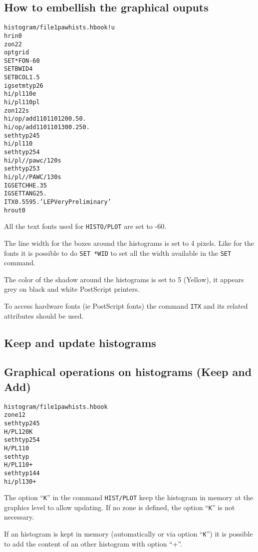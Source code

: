 \subsection*{How to embellish the graphical ouputs}
\begin{alltt}
      histogram/file 1 pawhists.hbook ! u
      hrin  0
      zon 2 2
      opt grid
     SET *FON -60
     SET BWID 4
     SET BCOL 1.5
      igset mtyp 26
      hi/pl 110 e
      hi/pl 110 pl
      zon 1 2 2 s
      hi/op/add 110 110 120 0.5 0.
      hi/op/add 110 110 130 0.25 0.
      set htyp 245
      hi/pl 110
      set htyp 254
      hi/pl //pawc/120 s
      set htyp 253
      hi/pl //PAWC/130 s
     IGSET CHHE .35
     IGSET TANG 25.
     ITX 0.55 95. 'LEP Very Preliminary'
      hrout 0
\end{alltt} 
\begin{DinglistE}
\item All the text fonts used for {\tt HISTO/PLOT} are set to -60.
\item The line width for the boxes around the histograms is set to 4 pixels.
      Like for the fonts it is possible to do {\tt SET *WID} to set all the
      width available in the {\tt SET} command.
\item The color of the shadow around the histograms is set to 5 (Yellow), it
      appears grey on black and white PostScript printers.
\item To access hardware fonts (ie PostScript fonts) the command {\tt ITX} and
      its related attributes should be used.
\end{DinglistE}

\clearpage

\subsection{Keep and update histograms}
\subsection*{Graphical operations on histograms (Keep and Add)}
\begin{alltt}
      histogram/file 1 pawhists.hbook
      zone 1 2
      set htyp 245
     H/PL 120 K
      set htyp 254
     H/PL 110
      set htyp
     H/PL 110 +
      set htyp 144
      hi/pl 130 +
\end{alltt} 
\begin{DinglistE}
\item The option ``{\tt K}'' in the command {\tt HIST/PLOT} keep the histogram
      in memory at the graphics level to allow updating. If no zone is
      defined, the option ``{\tt K}'' is not necessary.
\item If an histogram is kept in memory (automatically or via option
      ``{\tt K}'') it is possible to add the content of an other histogram
      with option ``+''.
\end{DinglistE}

